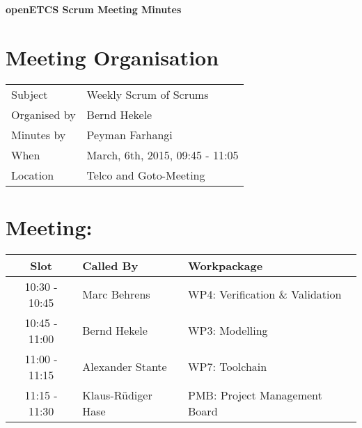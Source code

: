 \documentclass[a4paper, 11pt]{article}
\begin{document}
{\begin{center}\huge\bf openETCS Scrum Meeting Minutes\end{center}}
\section{Meeting Organisation}

\renewcommand{\arraystretch}{1.5}
\begin{supertabular}{m{.2\textwidth}m{.8\textwidth}}
Subject & Weekly Scrum of Scrums\\
Organised by &Bernd Hekele\\
Minutes by & Peyman Farhangi\\
When & March, 6th, 2015, 09:45 - 11:05\\
Location & Telco and Goto-Meeting\\
\end{supertabular}

\renewcommand{\arraystretch}{1.0}
\section{Meeting:}

\begin{tabular}{|c|l|l|}
\hline
\textbf{Slot} &  \textbf{Called By} & \textbf{Workpackage} \\
\hline  
10:30 - 10:45 & Marc Behrens & WP4: Verification \& Validation \\\hline  
10:45 - 11:00 & Bernd Hekele & WP3: Modelling \\\hline  
11:00 - 11:15 & Alexander Stante  & WP7: Toolchain \\\hline
11:15 - 11:30 & Klaus-R\"udiger Hase & PMB: Project Management Board \\\hline  
\end{tabular}
\end{document}
